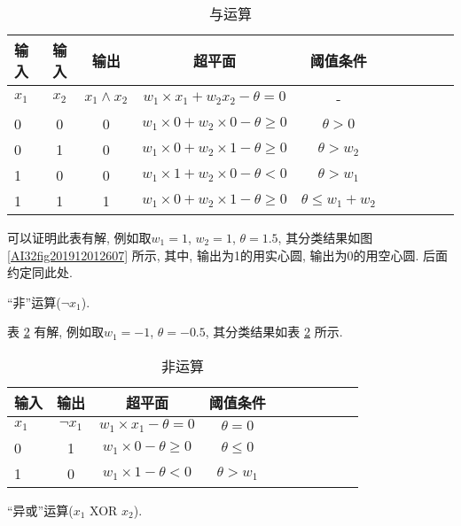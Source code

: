 \begin{table}[H]
\caption{与运算}
\begin{center}
\begin{tabular} {lccccccccc}
  \hline
输入&输入	&输出&超平面&	阈值条件\\
\hline
$x_1$&$x_2$&$x_1\wedge x_2$	&$w_1\times x_1+ w_2 x_2-\theta=0$  &-\\
0&	0&	0&$w_1\times 0+ w_2\times 0-\theta \geq 0$ 	&$\theta> 0$\\
0&	1&0	&$w_1\times0 + w_2\times1-\theta \geq 0$ 	&$\theta>w_2$\\
1&	0&	0&$w_1\times1+ w_2\times 0 -\theta <0$ 	    &$\theta >w_1$\\
1&	1&	1&$w_1\times0 + w_2\times 1-\theta \geq 0$ 	&$\theta\leq w_1+w_2$\\
\hline
\end{tabular}
\end{center}
\label{AI_table2019112900011}
\end{table}

可以证明此表有解, 例如取$w_1=1$, $w_2=1$, $\theta=1.5$, 其分类结果如图 \ref{AI32fig201912012607} 所示,
其中, 输出为1的用实心圆, 输出为0的用空心圆. 后面约定同此处.
\begin{example}
    “非”运算($\neg x_1$).
\end{example}

表 \ref{AI_table2019112902} 有解, 例如取$w_1=-1$, $\theta=-0.5$, 其分类结果如表 \ref{AI_table2019112902} 所示.
\begin{table}[H]
\caption{非运算}
\begin{center}
\begin{tabular} {lccccccccc}
  \hline
输入&	输出&	超平面&	阈值条件\\
\hline
$x_1$&	$\neg x_1$&	$w_1\times x_1-\theta=0$        &$\theta =0$\\
0&	1             &	$w_1\times 0 -\theta \geq 0$ 	&$\theta\leq 0$\\
1&	0             &	$w_1\times 1 -\theta <0$ 	    &$\theta >w_1$\\
\hline
\end{tabular}
\end{center}
\label{AI_table2019112902}
\end{table}

\begin{example}
    “异或”运算($x_1$ XOR $x_2$).
\end{example}


